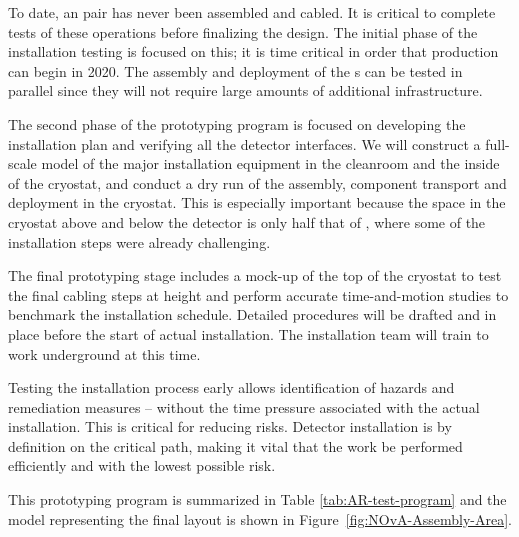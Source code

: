 To date, an  pair has never been assembled and cabled.  It is critical to complete tests of these operations before finalizing the  design. The initial phase of the installation testing is focused on this; it is time critical in order that  production can begin in 2020. The assembly and deployment of the s can  be tested in parallel since they will not require large amounts of additional infrastructure.

The second phase of the prototyping program is focused on developing the installation plan and verifying all the detector interfaces. 
We will construct a full-scale model of the major installation equipment in the cleanroom and the inside of the cryostat, and conduct a dry run of the assembly, component transport and deployment in the cryostat. 
This is especially important because the space in the  cryostat above and below the detector is only half that of , where some of the installation steps were already challenging.

The final prototyping stage includes a mock-up of the top of the cryostat to test the final cabling steps at height and perform  accurate time-and-motion studies to benchmark the installation schedule. Detailed procedures will be drafted and in place before the start of actual installation. The installation team will train to work underground at this time.


Testing the installation process early allows identification of  hazards and remediation measures -- without the time pressure associated with the actual installation. This is critical for reducing risks.  Detector installation is by definition on the critical path, making it vital that the work be performed efficiently and with the lowest possible risk. 

This prototyping program is summarized in Table \ref{tab:AR-test-program} and the \threed model representing the final layout is shown in Figure~\ref{fig:NOvA-Assembly-Area}. 

